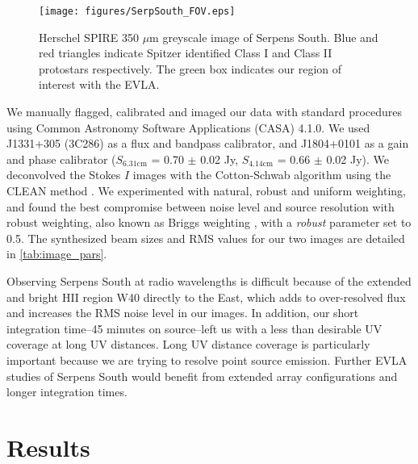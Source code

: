 \documentclass[apj]{emulateapj}
\begin{document}
\begin{figure}[h!]
\label{fig:serpsouth_fov}
\centering
\texttt{[image: figures/SerpSouth\_FOV.eps]}
\caption{\small{Herschel SPIRE 350 $\mu$m greyscale image of Serpens South. Blue and red triangles indicate Spitzer identified Class I and Class II protostars respectively. The green box indicates our region of interest with the EVLA.}}
\end{figure}

We manually flagged, calibrated and imaged our data with standard procedures using Common Astronomy Software Applications (CASA) 4.1.0. We used J1331+305 (3C286) as a flux and bandpass calibrator, and J1804+0101 as a gain and phase calibrator ($S_{6.31\text{cm}}$ = 0.70 $\pm$ 0.02 Jy, $S_{4.14\text{cm}}$ = 0.66 $\pm$ 0.02 Jy). We deconvolved the Stokes $I$ images with the Cotton-Schwab algorithm \citep{Schwab84} using the CLEAN method \citep{Hogbom74,Clark80}. We experimented with natural, robust and uniform weighting, and found the best compromise between noise level and source resolution with robust weighting, also known as Briggs weighting \citep{Briggs95}, with a \emph{robust} parameter set to 0.5. The synthesized beam sizes and RMS values for our two images are detailed in \autoref{tab:image_pars}.

Observing Serpens South at radio wavelengths is difficult because of the extended and bright HII region W40 directly to the East, which adds to over-resolved flux and increases the RMS noise level in our images. In addition, our short integration time--45 minutes on source--left us with a less than desirable UV coverage at long UV distances. Long UV distance coverage is particularly important because we are trying to resolve point source emission. Further EVLA studies of Serpens South would benefit from extended array configurations and longer integration times.

\section{Results}
\label{sec:results}
\end{document}
